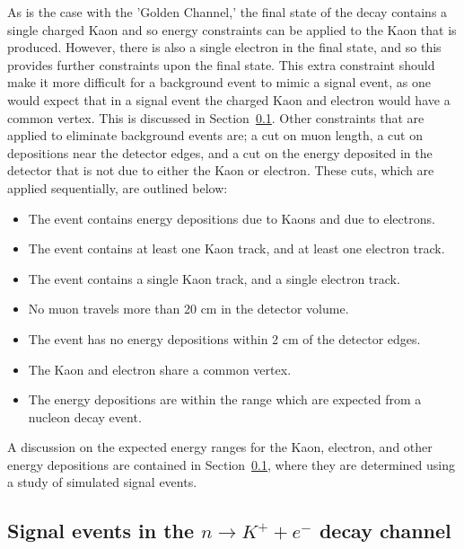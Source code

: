 As is the case with the 'Golden Channel,' the final state of the decay contains a single charged Kaon and so energy constraints can be applied to the Kaon that is produced. However, there is also a single electron in the final state, and so this provides further constraints upon the final state. This extra constraint should make it more difficult for a background event to mimic a signal event, as one would expect that in a signal event the charged Kaon and electron would have a common vertex. This is discussed in Section~\ref{sec:NDKSig}. Other constraints that are applied to eliminate background events are; a cut on muon length, a cut on depositions near the detector edges, and a cut on the energy deposited in the detector that is not due to either the Kaon or electron. These cuts, which are applied sequentially, are outlined below:
\begin{itemize}
\item The event contains energy depositions due to Kaons and due to electrons.
\item The event contains at least one Kaon track, and at least one electron track.
\item The event contains a single Kaon track, and a single electron track.
\item No muon travels more than 20 cm in the detector volume.
\item The event has no energy depositions within 2 cm of the detector edges.
\item The Kaon and electron share a common vertex.
\item The energy depositions are within the range which are expected from a nucleon decay event.
\end{itemize}
A discussion on the expected energy ranges for the Kaon, electron, and other energy depositions are contained in Section~\ref{sec:NDKSig}, where they are determined using a study of simulated signal events. \\


\subsection{Signal events in the $n \rightarrow K^{+} + e^{-}$ decay channel} \label{sec:NDKSig}

